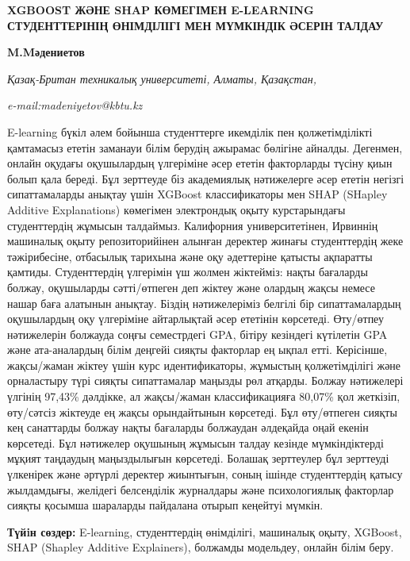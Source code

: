 \begin{articleheader}
{\bfseries XGBOOST ЖӘНЕ SHAP КӨМЕГІМЕН E-LEARNING СТУДЕНТТЕРІНІҢ ӨНІМДІЛІГІ МЕН МҮМКІНДІК ӘСЕРІН ТАЛДАУ}

{\bfseries M.Mәдениетов}
\end{articleheader}

\begin{affiliation}
\emph{Қазақ-Британ техникалық университеті, Алматы, Қазақстан,}

\emph{e-mail:madeniyetov@kbtu.kz}
\end{affiliation}

E-learning бүкіл әлем бойынша студенттерге икемділік пен қолжетімділікті
қамтамасыз ететін заманауи білім берудің ажырамас бөлігіне айналды.
Дегенмен, онлайн оқудағы оқушылардың үлгеріміне әсер ететін факторларды
түсіну қиын болып қала береді. Бұл зерттеуде біз академиялық нәтижелерге
әсер ететін негізгі сипаттамаларды анықтау үшін XGBoost классификаторы
мен SHAP (SHapley Additive Explanations) көмегімен электрондық оқыту
курстарындағы студенттердің жұмысын талдаймыз. Калифорния
университетінен, Ирвиннің машиналық оқыту репозиторийінен алынған
деректер жинағы студенттердің жеке тәжірибесіне, отбасылық тарихына және
оқу әдеттеріне қатысты ақпаратты қамтиды. Студенттердің үлгерімін үш
жолмен жіктейміз: нақты бағаларды болжау, оқушыларды сәтті/өтпеген деп
жіктеу және олардың жақсы немесе нашар баға алатынын анықтау. Біздің
нәтижелеріміз белгілі бір сипаттамалардың оқушылардың оқу үлгеріміне
айтарлықтай әсер ететінін көрсетеді. Өту/өтпеу нәтижелерін болжауда
соңғы семестрдегі GPA, бітіру кезіндегі күтілетін GPA және ата-аналардың
білім деңгейі сияқты факторлар ең ықпал етті. Керісінше, жақсы/жаман
жіктеу үшін курс идентификаторы, жұмыстың қолжетімділігі және
орналастыру түрі сияқты сипаттамалар маңызды рөл атқарды. Болжау
нәтижелері үлгінің 97,43\% дәлдікке, ал жақсы/жаман классификацияға
80,07\% қол жеткізіп, өту/сәтсіз жіктеуде ең жақсы орындайтынын
көрсетеді. Бұл өту/өтпеген сияқты кең санаттарды болжау нақты бағаларды
болжаудан әлдеқайда оңай екенін көрсетеді. Бұл нәтижелер оқушының
жұмысын талдау кезінде мүмкіндіктерді мұқият таңдаудың маңыздылығын
көрсетеді. Болашақ зерттеулер бұл зерттеуді үлкенірек және әртүрлі
деректер жиынтығын, соның ішінде студенттердің қатысу жылдамдығы,
желідегі белсенділік журналдары және психологиялық факторлар сияқты
қосымша шараларды пайдалана отырып кеңейтуі мүмкін.

{\bfseries Түйiн сөздер:} E-learning, студенттердің өнімділігі, машиналық
оқыту, XGBoost, SHAP (Shapley Additive Explainers), болжамды модельдеу,
онлайн білім беру.

